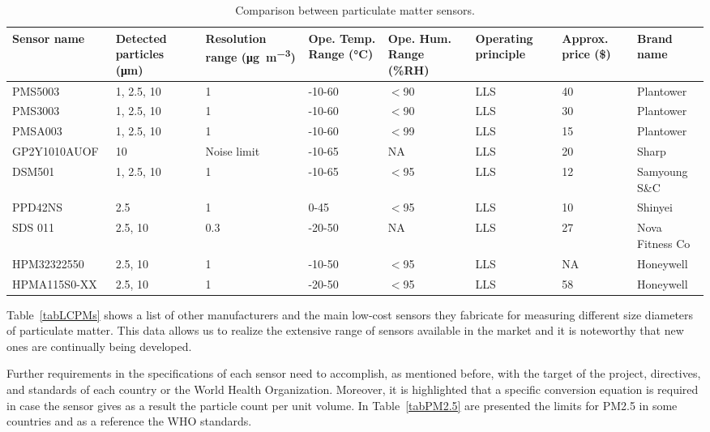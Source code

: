 \documentclass[10pt]{../style_src/imeko_acta}
\begin{document}
\begin{table}[!t]
	\caption{Comparison between particulate matter sensors.}
        \label{tabPMsensor}
	\centering
    \begin{tabular}{p{3cm}p{1.5cm}p{1.5cm}p{1.5cm}p{1.5cm}p{1.5cm}p{1.5cm}p{2.5cm}}
        \toprule
	Sensor name	& Detected particles (\unit{\um})& Resolution range (\unit{\ug\per\meter\tothe{3}}) &       Ope. Temp. Range (\unit{\degreeCelsius}) & Ope. Hum. Range (\%RH)& Operating principle&          Approx. price (\$) & Brand name\\
	\midrule
	PMS5003~\cite{PMS5003}\therownum & 1, 2.5, 10 & 1 & -10-60 & $<$90 & LLS     & 40 & Plantower\\
	PMS3003~\cite{PMS3003}\therownum& 1, 2.5, 10 & 1 & -10-60  & $<$90 & LLS  & 30 & Plantower \\
	PMSA003~\cite{PMSA0003} & 1, 2.5, 10 & 1 & -10-60 & $<$99 & LLS & 15 & Plantower \\
	GP2Y1010AUOF~\cite{GP2Y1010AU0F} & 10 & Noise limit & -10-65 & NA & LLS & 20 & Sharp \\
	DSM501~\cite{DSM501} & 1,  2.5, 10& 1 & -10-65 & $<$95 & LLS & 12 & Samyoung S\&C\\
	PPD42NS~\cite{PPD42NS} & 2.5 & 1  & 0-45 & $<$95 & LLS & 10 & Shinyei \\
	SDS 011~\cite{SDS011} &2.5, 10  &  0.3 & -20-50 & NA  & LLS & 27 & Nova Fitness Co\\
	HPM32322550~\cite{HPM32322550} & 2.5, 10 & 1 & -10-50 & $<$95 & LLS & NA & Honeywell\\
	HPMA115S0-XX~\cite{HPM32322550} & 2.5, 10 & 1 & -20-50 & $<$95 & LLS & 58 & Honeywell\\
	\bottomrule
	\end{tabular}
\end{table}

Table~\ref{tabLCPMs} shows a list of other manufacturers and the main low-cost sensors they fabricate for measuring different size diameters of particulate matter. This data allows us to realize the extensive range of sensors available in the market and it is noteworthy that new ones are continually being developed. 



Further requirements in the specifications of each sensor need to accomplish, as mentioned before, with the target of the project, directives, and standards of each country or the World Health Organization. Moreover, it is highlighted that a specific conversion equation is required in case the sensor gives as a result the particle count per unit volume.
 In Table~\ref{tabPM2.5} are presented the limits for PM2.5 in some countries and as a reference the WHO standards.
\end{document}
